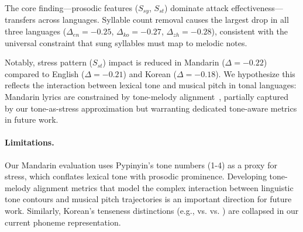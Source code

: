 The core finding---prosodic features ($S_{sy}$, $S_{st}$) dominate attack effectiveness---transfers across languages. Syllable count removal causes the largest drop in all three languages ($\Delta_{en} = -0.25$, $\Delta_{ko} = -0.27$, $\Delta_{zh} = -0.28$), consistent with the universal constraint that sung syllables must map to melodic notes.

Notably, stress pattern ($S_{st}$) impact is reduced in Mandarin ($\Delta = -0.22$) compared to English ($\Delta = -0.21$) and Korean ($\Delta = -0.18$). We hypothesize this reflects the interaction between lexical tone and musical pitch in tonal languages: Mandarin lyrics are constrained by tone-melody alignment~\cite{wong2012tonal}, partially captured by our tone-as-stress approximation but warranting dedicated tone-aware metrics in future work.

\paragraph{Limitations.}
Our Mandarin evaluation uses Pypinyin's tone numbers (1-4) as a proxy for stress, which conflates lexical tone with prosodic prominence. Developing tone-melody alignment metrics that model the complex interaction between linguistic tone contours and musical pitch trajectories is an important direction for future work. Similarly, Korean's tenseness distinctions (e.g.,  vs.  vs. ) are collapsed in our current phoneme representation.
